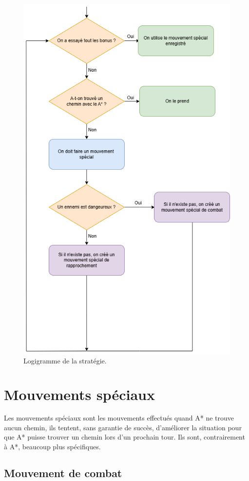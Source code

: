 \begin{figure}[!htpb]
    \centering
    \includegraphics[width=0.75\linewidth]{Figures/diagramme2.png}
    \caption[Logigramme de la stratégie.]{Logigramme de la stratégie.}
    \label{fig:logigramme}
\end{figure}

\newpage

\section{Mouvements spéciaux}

Les mouvements spéciaux sont les mouvements effectués quand A* ne trouve aucun chemin, ils tentent, sans garantie de succès, d'améliorer la situation pour que A* puisse trouver un chemin lors d'un prochain tour.
\newline
Ils sont, contrairement à A*, beaucoup plus spécifiques.

\subsection{Mouvement de combat}

